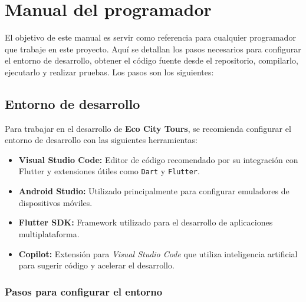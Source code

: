\section{Manual del programador}

El objetivo de este manual es servir como referencia para cualquier programador que trabaje en este proyecto. Aquí se detallan los pasos necesarios para configurar el entorno de desarrollo, obtener el código fuente desde el repositorio, compilarlo, ejecutarlo y realizar pruebas. Los pasos son los siguientes:

\subsection{Entorno de desarrollo}

Para trabajar en el desarrollo de \textbf{Eco City Tours}, se recomienda configurar el entorno de desarrollo con las siguientes herramientas:

\begin{itemize}
	\item \textbf{Visual Studio Code:} Editor de código recomendado por su integración con Flutter y extensiones útiles como \texttt{Dart} y \texttt{Flutter}.
	\item \textbf{Android Studio:} Utilizado principalmente para configurar emuladores de dispositivos móviles.
	\item \textbf{Flutter SDK:} Framework utilizado para el desarrollo de aplicaciones multiplataforma. 
	\item \textbf{Copilot:} Extensión para \textit{Visual Studio Code} que utiliza inteligencia artificial para sugerir código y acelerar el desarrollo.
\end{itemize}

\subsubsection{Pasos para configurar el entorno}

